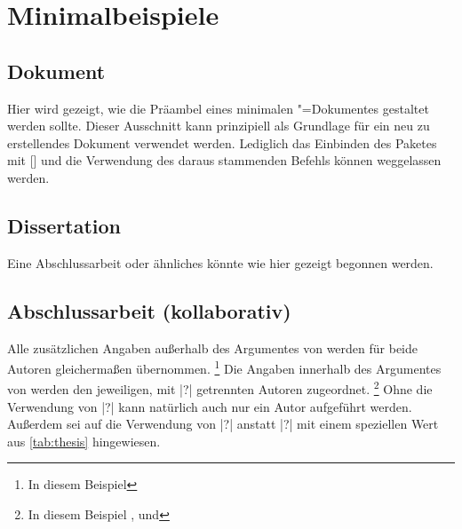 \chapter{Minimalbeispiele}
%
%
\section{Dokument}
%
%
Hier wird gezeigt, wie die Präambel eines minimalen "=Dokumentes 
gestaltet werden sollte. Dieser Ausschnitt kann prinzipiell als Grundlage für 
ein neu zu erstellendes Dokument verwendet werden. Lediglich das Einbinden des 
Paketes  mit [] und 
die Verwendung des daraus stammenden Befehls  können 
weggelassen werden.

\section{Dissertation}
%
%
%
Eine Abschlussarbeit oder ähnliches könnte wie hier gezeigt begonnen werden.

\section{Abschlussarbeit (kollaborativ)}
%
%
%
%
Alle zusätzlichen Angaben außerhalb des Argumentes von  werden 
für beide Autoren gleichermaßen übernommen.%
\footnote{In diesem Beispiel }
Die Angaben innerhalb des Argumentes von  werden den jeweiligen, 
mit |?| getrennten Autoren zugeordnet.%
\footnote{%
  In diesem Beispiel ,  und 
}
Ohne die Verwendung von |?| kann natürlich auch nur ein Autor 
aufgeführt werden. Außerdem sei auf die Verwendung von |?| 
anstatt |?| mit einem speziellen Wert aus \autoref{tab:thesis} 
hingewiesen.


